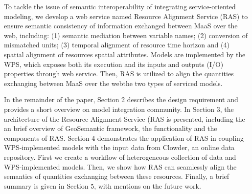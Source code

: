 \documentclass[review]{elsarticle}
\begin{document}
To tackle the issue of semantic interoperability of integrating service-oriented modeling, we develop a web service named Resource Alignment Service (RAS) to ensure semantic consistency of information exchanged between MaaS over the web, including: (1) semantic mediation between variable names; (2) conversion of mismatched units; (3) temporal alignment of resource time horizon and (4) spatial alignment of resources spatial attributes. Models are implemented by the WPS, which exposes both its execution and its inputs and outputs (I/O) properties through web service. Then, RAS is utilized to align the quantities exchanging between MaaS over the webthe two types of serviced models.

In the remainder of the paper, Section 2 describes the design requirement and provides a short overview on model integration community. In Section 3, the architecture of the Resource Alignment Service (RAS is presented, including the an brief overview of GeoSemantic framework, the functionality and the components of RAS. Section 4 demonstrates the application of RAS in coupling WPS-implemented models with the input data from Clowder, an online data repository. First we create a workflow of heterogeneous collection of data and WPS-implemented models. Then, we show how RAS can seamlessly align the semantics of quantities exchanging between these resources. Finally, a brief summary is given in Section 5, with mentions on the future work. 
\end{document}

